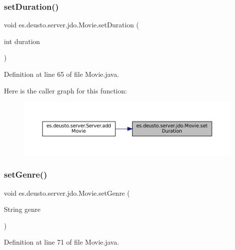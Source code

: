 \subsubsection{\texorpdfstring{setDuration()}{setDuration()}}
{\footnotesize\ttfamily void es.\+deusto.\+server.\+jdo.\+Movie.\+set\+Duration (\begin{DoxyParamCaption}\item[{int}]{duration }\end{DoxyParamCaption})}



Definition at line 65 of file Movie.\+java.

Here is the caller graph for this function\+:
\nopagebreak
\begin{figure}[H]
\begin{center}
\leavevmode
\includegraphics[width=350pt]{classes_1_1deusto_1_1server_1_1jdo_1_1_movie_a045b89a0ae1e637d8944f34c97f8c34e_icgraph}
\end{center}
\end{figure}
\mbox{\label{classes_1_1deusto_1_1server_1_1jdo_1_1_movie_aae8757b5e3229b6b521a0b8dab606eff}} 
\subsubsection{\texorpdfstring{setGenre()}{setGenre()}}
{\footnotesize\ttfamily void es.\+deusto.\+server.\+jdo.\+Movie.\+set\+Genre (\begin{DoxyParamCaption}\item[{String}]{genre }\end{DoxyParamCaption})}



Definition at line 71 of file Movie.\+java.

